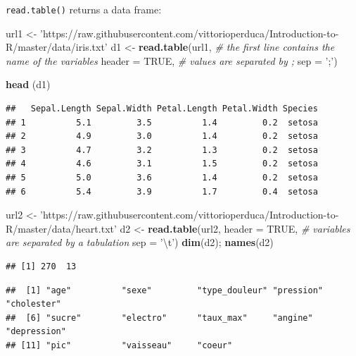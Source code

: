 \documentclass[]{book}
\newenvironment{Shaded}{\begin{snugshade}}{\end{snugshade}}
\newcommand{\CharTok}[1]{\textcolor[rgb]{0.31,0.60,0.02}{#1}}
\newcommand{\CommentTok}[1]{\textcolor[rgb]{0.56,0.35,0.01}{\textit{#1}}}
\newcommand{\DataTypeTok}[1]{\textcolor[rgb]{0.13,0.29,0.53}{#1}}
\newcommand{\KeywordTok}[1]{\textcolor[rgb]{0.13,0.29,0.53}{\textbf{#1}}}
\newcommand{\NormalTok}[1]{#1}
\newcommand{\OtherTok}[1]{\textcolor[rgb]{0.56,0.35,0.01}{#1}}
\newcommand{\StringTok}[1]{\textcolor[rgb]{0.31,0.60,0.02}{#1}}
\begin{document}
\texttt{read.table()} returns a data frame:

\begin{Shaded}
\begin{Highlighting}[]
\NormalTok{url1 <-}\StringTok{ 'https://raw.githubusercontent.com/vittorioperduca/Introduction-to-R/master/data/iris.txt'}
\NormalTok{d1 <-}\StringTok{ }\KeywordTok{read.table}\NormalTok{(url1,}
                 \CommentTok{# the first line contains the name of the variables}
                 \DataTypeTok{header =} \OtherTok{TRUE}\NormalTok{,}
                 \CommentTok{# values are separated by ;}
                 \DataTypeTok{sep =} \StringTok{';'}\NormalTok{) }

\KeywordTok{head}\NormalTok{ (d1)}
\end{Highlighting}
\end{Shaded}

\begin{verbatim}
##   Sepal.Length Sepal.Width Petal.Length Petal.Width Species
## 1          5.1         3.5          1.4         0.2  setosa
## 2          4.9         3.0          1.4         0.2  setosa
## 3          4.7         3.2          1.3         0.2  setosa
## 4          4.6         3.1          1.5         0.2  setosa
## 5          5.0         3.6          1.4         0.2  setosa
## 6          5.4         3.9          1.7         0.4  setosa
\end{verbatim}

\begin{Shaded}
\begin{Highlighting}[]
\NormalTok{url2 <-}\StringTok{ 'https://raw.githubusercontent.com/vittorioperduca/Introduction-to-R/master/data/heart.txt'}
\NormalTok{d2 <-}\StringTok{ }\KeywordTok{read.table}\NormalTok{(url2,}
                 \DataTypeTok{header =} \OtherTok{TRUE}\NormalTok{,}
                 \CommentTok{# variables are separated by a tabulation}
                 \DataTypeTok{sep =} \StringTok{'}\CharTok{\textbackslash{}t}\StringTok{'}\NormalTok{) }
\KeywordTok{dim}\NormalTok{(d2); }\KeywordTok{names}\NormalTok{(d2)}
\end{Highlighting}
\end{Shaded}

\begin{verbatim}
## [1] 270  13
\end{verbatim}

\begin{verbatim}
##  [1] "age"          "sexe"         "type_douleur" "pression"     "cholester"   
##  [6] "sucre"        "electro"      "taux_max"     "angine"       "depression"  
## [11] "pic"          "vaisseau"     "coeur"
\end{verbatim}
\end{document}
